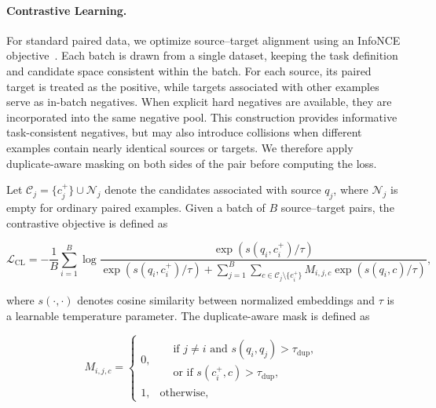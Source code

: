 \documentclass[]{wechat}
\begin{document}
\paragraph{Contrastive Learning.}

For standard paired data, we optimize source--target alignment using an InfoNCE objective~\citep{infonce}. Each batch is drawn from a single dataset, keeping the task definition and candidate space consistent within the batch. For each source, its paired target is treated as the positive, while targets associated with other examples serve as in-batch negatives. When explicit hard negatives are available, they are incorporated into the same negative pool. This construction provides informative task-consistent negatives, but may also introduce collisions when different examples contain nearly identical sources or targets. We therefore apply duplicate-aware masking on both sides of the pair before computing the loss.

Let
$\mathcal{C}_j=\{c_j^{+}\}\cup\mathcal{N}_j$
denote the candidates associated with source $q_j$, where $\mathcal{N}_j$ is empty for ordinary paired examples. Given a batch of $B$ source--target pairs, the contrastive objective is defined as

\begin{equation}
    \mathcal{L}_{\mathrm{CL}}
    =
    -
    \frac{1}{B}
    \sum_{i=1}^{B}
    \log
    \frac{
        \exp\left(s(q_i,c_i^{+})/\tau\right)
    }{
        \exp\left(s(q_i,c_i^{+})/\tau\right)
        +
        \displaystyle
        \sum_{j=1}^{B}
        \sum_{c\in\mathcal{C}_j\setminus\{c_i^{+}\}}
        M_{i,j,c}
        \exp\left(s(q_i,c)/\tau\right)
    },
    \label{eq:contrastive_loss}
\end{equation}

where $s(\cdot,\cdot)$ denotes cosine similarity between normalized embeddings and $\tau$ is a learnable temperature parameter. The duplicate-aware mask is defined as

\begin{equation}
    M_{i,j,c}
    =
    \begin{cases}
        0,
        &
        \begin{aligned}
        &\text{if } j\neq i
        \text{ and }
        s(q_i,q_j)>\tau_{\mathrm{dup}},\\[-2pt]
        &\text{or if }
        s(c_i^{+},c)>\tau_{\mathrm{dup}},
        \end{aligned}
        \\[8pt]
        1,
        & \text{otherwise},
    \end{cases}
    \label{eq:duplicate_mask}
\end{equation}
\end{document}
